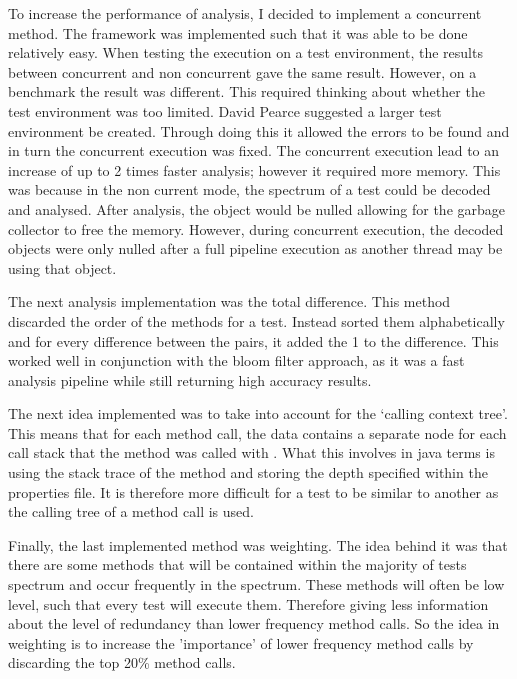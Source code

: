 To increase the performance of analysis, I decided to implement a concurrent method. The framework was implemented such that it was able to be done relatively easy. When testing the execution on a test environment, the results between concurrent and non concurrent gave the same result. However, on a benchmark the result was different. This required thinking about whether the test environment was too limited. David Pearce suggested a larger test environment be created. Through doing this it allowed the errors to be found and in turn the concurrent execution was fixed. The concurrent execution lead to an increase of up to 2 times faster analysis; however it required more memory. This was because in the non current mode, the spectrum of a test could be decoded and analysed. After analysis, the object would be nulled allowing for the garbage collector to free the memory. However, during concurrent execution, the decoded objects were only nulled after a full pipeline execution as another thread may be using that object. 

The next analysis implementation was the total difference. This method discarded the order of the methods for a test. Instead sorted them alphabetically and for every difference between the pairs, it added the 1 to the difference. This worked well in conjunction with the bloom filter approach, as it was a fast analysis pipeline while still returning high accuracy results. 

The next idea implemented was to take into account for the ‘calling context tree’. This means that for each method call, the data contains a separate node for each call stack that the method was called with \cite{callingcontext}. What this involves in java terms is using the stack trace of the method and storing the depth specified within the properties file. It is therefore more difficult for a test to be similar to another as the calling tree of a method call is used.

Finally, the last implemented method was weighting. The idea behind it was that there are some methods that will be contained within the majority of tests spectrum and occur frequently in the spectrum. These methods will often be low level, such that every test will execute them. Therefore giving less information about the level of redundancy than lower frequency method calls. So the idea in weighting is to increase the 'importance' of lower frequency method calls by discarding the top 20\% method calls.

